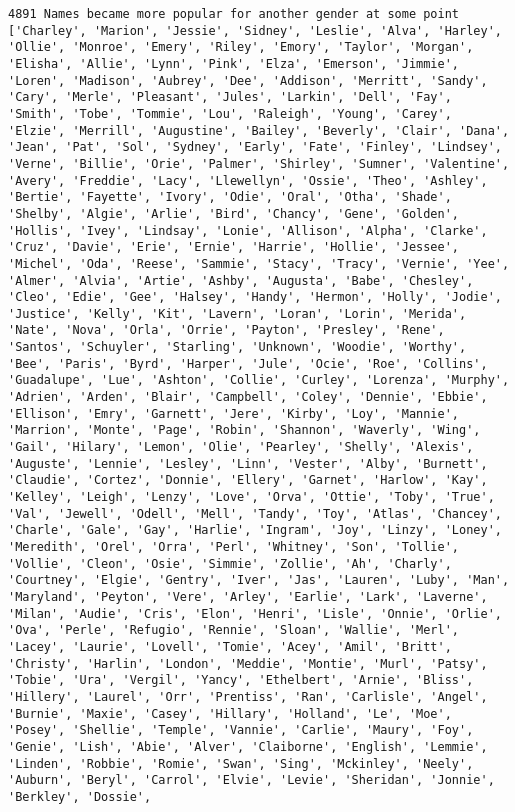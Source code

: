 \documentclass[11pt]{article}
\begin{document}
    \begin{Verbatim}[commandchars=\\\{\}]
4891 Names became more popular for another gender at some point
['Charley', 'Marion', 'Jessie', 'Sidney', 'Leslie', 'Alva', 'Harley', 'Ollie', 'Monroe', 'Emery', 'Riley', 'Emory', 'Taylor', 'Morgan', 'Elisha', 'Allie', 'Lynn', 'Pink', 'Elza', 'Emerson', 'Jimmie', 'Loren', 'Madison', 'Aubrey', 'Dee', 'Addison', 'Merritt', 'Sandy', 'Cary', 'Merle', 'Pleasant', 'Jules', 'Larkin', 'Dell', 'Fay', 'Smith', 'Tobe', 'Tommie', 'Lou', 'Raleigh', 'Young', 'Carey', 'Elzie', 'Merrill', 'Augustine', 'Bailey', 'Beverly', 'Clair', 'Dana', 'Jean', 'Pat', 'Sol', 'Sydney', 'Early', 'Fate', 'Finley', 'Lindsey', 'Verne', 'Billie', 'Orie', 'Palmer', 'Shirley', 'Sumner', 'Valentine', 'Avery', 'Freddie', 'Lacy', 'Llewellyn', 'Ossie', 'Theo', 'Ashley', 'Bertie', 'Fayette', 'Ivory', 'Odie', 'Oral', 'Otha', 'Shade', 'Shelby', 'Algie', 'Arlie', 'Bird', 'Chancy', 'Gene', 'Golden', 'Hollis', 'Ivey', 'Lindsay', 'Lonie', 'Allison', 'Alpha', 'Clarke', 'Cruz', 'Davie', 'Erie', 'Ernie', 'Harrie', 'Hollie', 'Jessee', 'Michel', 'Oda', 'Reese', 'Sammie', 'Stacy', 'Tracy', 'Vernie', 'Yee', 'Almer', 'Alvia', 'Artie', 'Ashby', 'Augusta', 'Babe', 'Chesley', 'Cleo', 'Edie', 'Gee', 'Halsey', 'Handy', 'Hermon', 'Holly', 'Jodie', 'Justice', 'Kelly', 'Kit', 'Lavern', 'Loran', 'Lorin', 'Merida', 'Nate', 'Nova', 'Orla', 'Orrie', 'Payton', 'Presley', 'Rene', 'Santos', 'Schuyler', 'Starling', 'Unknown', 'Woodie', 'Worthy', 'Bee', 'Paris', 'Byrd', 'Harper', 'Jule', 'Ocie', 'Roe', 'Collins', 'Guadalupe', 'Lue', 'Ashton', 'Collie', 'Curley', 'Lorenza', 'Murphy', 'Adrien', 'Arden', 'Blair', 'Campbell', 'Coley', 'Dennie', 'Ebbie', 'Ellison', 'Emry', 'Garnett', 'Jere', 'Kirby', 'Loy', 'Mannie', 'Marrion', 'Monte', 'Page', 'Robin', 'Shannon', 'Waverly', 'Wing', 'Gail', 'Hilary', 'Lemon', 'Olie', 'Pearley', 'Shelly', 'Alexis', 'Auguste', 'Lennie', 'Lesley', 'Linn', 'Vester', 'Alby', 'Burnett', 'Claudie', 'Cortez', 'Donnie', 'Ellery', 'Garnet', 'Harlow', 'Kay', 'Kelley', 'Leigh', 'Lenzy', 'Love', 'Orva', 'Ottie', 'Toby', 'True', 'Val', 'Jewell', 'Odell', 'Mell', 'Tandy', 'Toy', 'Atlas', 'Chancey', 'Charle', 'Gale', 'Gay', 'Harlie', 'Ingram', 'Joy', 'Linzy', 'Loney', 'Meredith', 'Orel', 'Orra', 'Perl', 'Whitney', 'Son', 'Tollie', 'Vollie', 'Cleon', 'Osie', 'Simmie', 'Zollie', 'Ah', 'Charly', 'Courtney', 'Elgie', 'Gentry', 'Iver', 'Jas', 'Lauren', 'Luby', 'Man', 'Maryland', 'Peyton', 'Vere', 'Arley', 'Earlie', 'Lark', 'Laverne', 'Milan', 'Audie', 'Cris', 'Elon', 'Henri', 'Lisle', 'Onnie', 'Orlie', 'Ova', 'Perle', 'Refugio', 'Rennie', 'Sloan', 'Wallie', 'Merl', 'Lacey', 'Laurie', 'Lovell', 'Tomie', 'Acey', 'Amil', 'Britt', 'Christy', 'Harlin', 'London', 'Meddie', 'Montie', 'Murl', 'Patsy', 'Tobie', 'Ura', 'Vergil', 'Yancy', 'Ethelbert', 'Arnie', 'Bliss', 'Hillery', 'Laurel', 'Orr', 'Prentiss', 'Ran', 'Carlisle', 'Angel', 'Burnie', 'Maxie', 'Casey', 'Hillary', 'Holland', 'Le', 'Moe', 'Posey', 'Shellie', 'Temple', 'Vannie', 'Carlie', 'Maury', 'Foy', 'Genie', 'Lish', 'Abie', 'Alver', 'Claiborne', 'English', 'Lemmie', 'Linden', 'Robbie', 'Romie', 'Swan', 'Sing', 'Mckinley', 'Neely', 'Auburn', 'Beryl', 'Carrol', 'Elvie', 'Levie', 'Sheridan', 'Jonnie', 'Berkley', 'Dossie', 
\end{Verbatim}
\end{document}
